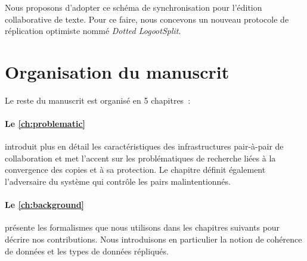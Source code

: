 Nous proposons d'adopter ce schéma de synchronisation pour l'édition collaborative de texte.
Pour ce faire, nous concevons un nouveau protocole de réplication optimiste nommé \emph{Dotted LogootSplit}.


\section{Organisation du manuscrit}

Le reste du manuscrit est organisé en 5 chapitres~:

\paragraph{Le \autoref{ch:problematic}} introduit plus en détail les caractéristiques des infrastructures pair-à-pair de collaboration et met l'accent sur les problématiques de recherche liées à la convergence des copies et à sa protection. Le chapitre définit également l'adversaire du système qui contrôle les pairs malintentionnés.

\paragraph{Le \autoref{ch:background}} présente les formalismes que nous utilisons dans les chapitres suivants pour décrire nos contributions.
Nous introduisons en particulier la notion de cohérence de données et les types de données répliqués.


